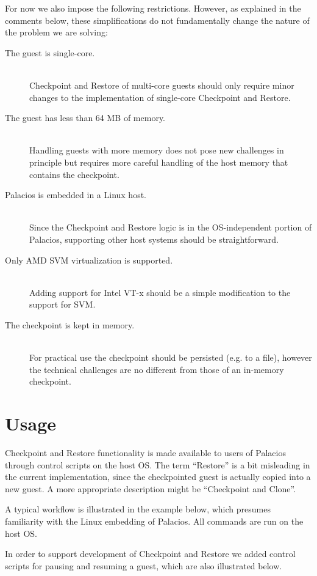 \documentclass{acm_proc_article-sp}
\begin{document}
For now we also impose the following restrictions. However, as explained in the comments below, these simplifications do not fundamentally change the nature of the problem we are solving:
\begin{description}
\item[The guest is single-core.]\hfill\\
Checkpoint and Restore of multi-core guests should only require minor changes to the implementation of single-core Checkpoint and Restore.
\item[The guest has less than 64 MB of memory.]\hfill\\
Handling guests with more memory does not pose new challenges in principle but requires more careful handling of the host memory that contains the checkpoint.
\item[Palacios is embedded in a Linux host.]\hfill\\
Since the Checkpoint and Restore logic is in the OS-independent portion of Palacios, supporting other host systems should be straightforward.
\item[Only AMD SVM \cite{SVM} virtualization is supported.]\hfill\\
Adding support for Intel VT-x \cite{VTX} should be a simple modification to the support for SVM.
\item[The checkpoint is kept in memory.]\hfill\\
For practical use the checkpoint should be persisted (e.g. to a file), however the technical challenges are no different from those of an in-memory checkpoint.
\end{description}

\section{Usage}
Checkpoint and Restore functionality is made available to users of Palacios through control scripts on the host OS. The term ``Restore'' is a bit misleading in the current implementation, since the checkpointed guest is actually copied into a new guest. A more appropriate description might be ``Checkpoint and Clone''.

A typical workflow is illustrated in the example below, which presumes familiarity with the Linux embedding of Palacios. All commands are run on the host OS.

In order to support development of Checkpoint and Restore we added control scripts for pausing and resuming a guest, which are also illustrated below.
\end{document}
